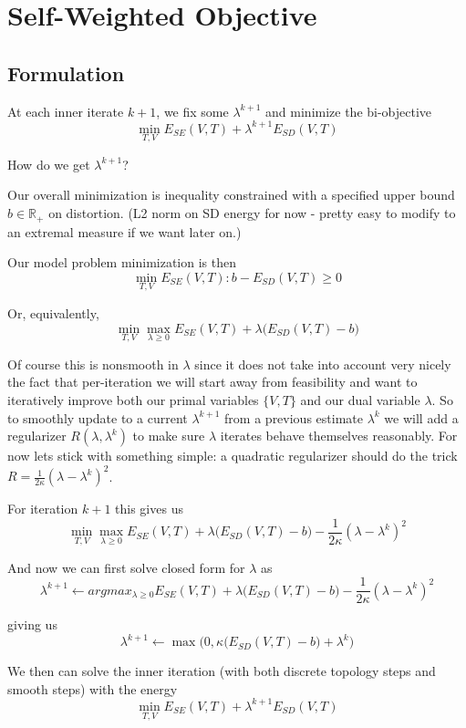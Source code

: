 
\section{Self-Weighted Objective}
\label{sec:self_weighting}

\subsection{Formulation}
At each inner iterate $k+1$, we fix some $\lambda^{k+1}$ and minimize the bi-objective 
\[ \min_{T,V} E_{SE}(V,T) + \lambda^{k+1} E_{SD}(V,T) \]

How do we get $\lambda^{k+1}$? 

Our overall minimization is inequality constrained with a specified upper bound $b \in \mathbb{R}_+$ on distortion. (L2 norm on SD  energy for now - pretty easy to modify to an extremal measure if we want later on.)

Our model problem minimization is then 
\[ \min_{T,V} E_{SE}(V,T) :  b - E_{SD}(V,T) \geq 0 \]

Or, equivalently,
\[ \min_{T,V} \max_{\lambda \geq 0} E_{SE}(V,T) + \lambda \big( E_{SD}(V,T) - b\big) \]

Of course this is nonsmooth in $\lambda$ since it does not take into account very nicely the fact that per-iteration we will start away from feasibility and want to iteratively improve both our primal variables $\{V,T\}$ and our dual variable $\lambda$.  So to smoothly update to a current $\lambda^{k+1}$ from a previous estimate $\lambda^k$ we will add a regularizer $R(\lambda,\lambda^k)$ to make sure $\lambda$ iterates behave themselves reasonably. For now lets stick with something simple: a quadratic regularizer should do the trick  $R =\frac{1}{2\kappa} (\lambda- \lambda^k)^2$. 

For iteration $k+1$ this gives us 
\[ \min_{T,V} \max_{\lambda \geq 0} E_{SE}(V,T) + \lambda \big( E_{SD}(V,T) - b\big) - \frac{1}{2\kappa} (\lambda- \lambda^k)^2 \]

And now we can first solve closed form for $\lambda$ as 
\[ \lambda^{k+1} \leftarrow argmax_{\lambda \geq 0} E_{SE}(V,T) + \lambda \big( E_{SD}(V,T) - b\big) - \frac{1}{2\kappa} (\lambda- \lambda^k)^2 \]

giving us 
\[ \lambda^{k+1} \leftarrow \max\big(0,\kappa \big( E_{SD}(V,T) -b \big) + \lambda^k\big) \]

We then can solve the inner iteration (with both discrete topology steps and smooth steps) with the energy 
\[ \min_{T,V}  E_{SE}(V,T) + \lambda^{k+1}  E_{SD}(V,T) \]

